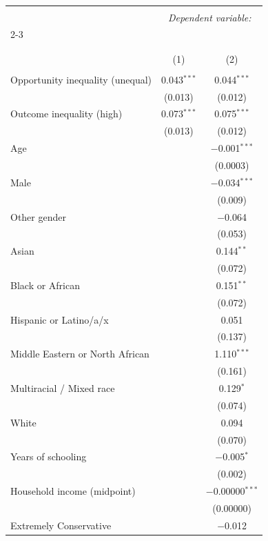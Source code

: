
\begin{table}[H] \centering 
  \caption{} 
  \label{} 
\tiny 
\begin{tabular}{@{\extracolsep{5pt}}lcc} 
\\[-1.8ex]\hline 
\hline \\[-1.8ex] 
 & \multicolumn{2}{c}{\textit{Dependent variable:}} \\ 
\cline{2-3} 
\\[-1.8ex] & \multicolumn{2}{c}{} \\ 
\\[-1.8ex] & (1) & (2)\\ 
\hline \\[-1.8ex] 
 Opportunity inequality (unequal) & 0.043$^{***}$ & 0.044$^{***}$ \\ 
  & (0.013) & (0.012) \\ 
  Outcome inequality (high) & 0.073$^{***}$ & 0.075$^{***}$ \\ 
  & (0.013) & (0.012) \\ 
  Age &  & $-$0.001$^{***}$ \\ 
  &  & (0.0003) \\ 
  Male &  & $-$0.034$^{***}$ \\ 
  &  & (0.009) \\ 
  Other gender &  & $-$0.064 \\ 
  &  & (0.053) \\ 
  Asian &  & 0.144$^{**}$ \\ 
  &  & (0.072) \\ 
  Black or African &  & 0.151$^{**}$ \\ 
  &  & (0.072) \\ 
  Hispanic or Latino/a/x &  & 0.051 \\ 
  &  & (0.137) \\ 
  Middle Eastern or North African &  & 1.110$^{***}$ \\ 
  &  & (0.161) \\ 
  Multiracial / Mixed race &  & 0.129$^{*}$ \\ 
  &  & (0.074) \\ 
  White &  & 0.094 \\ 
  &  & (0.070) \\ 
  Years of schooling &  & $-$0.005$^{*}$ \\ 
  &  & (0.002) \\ 
  Household income (midpoint) &  & $-$0.00000$^{***}$ \\ 
  &  & (0.00000) \\ 
  Extremely Conservative &  & $-$0.012 \\ 

\end{tabular}
\end{table}
